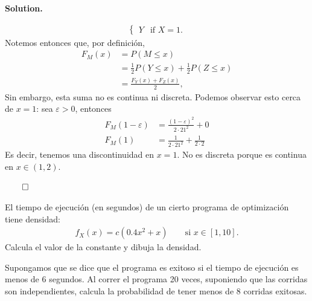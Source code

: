 \documentclass{article}
\theoremstyle{problemstyle}
\newenvironment{solution}{%
  \begin{mdframed}[linewidth=0.8pt,linecolor=Gray,backgroundcolor=Gray!5,roundcorner=5pt]%
  \noindent\textbf{Solution.}%
}{%
\hfill $ \qed $ 
  \end{mdframed}%
}
\begin{document}
\begin{solution}
\begin{align*}
\begin{cases}
			    Y & \text{if } X = 1.
		    \end{cases}
	\end{align*}
	Notemos entonces que, por definici\'on,
	\begin{align*}
		F_M(x) & = P(M\leq x)                                     \\
		       & = \frac{1}{2}P(Y\leq x) + \frac{1}{2} P(Z\leq x) \\
		       & = \displaystyle\frac{F_Y(x) + F_Z(x)}{2},
	\end{align*}
	Sin embargo, esta suma no es continua ni discreta. Podemos observar esto cerca de $ x = 1 $: sea $ \varepsilon > 0 $, entonces
	\begin{align*}
		F_M(1-\varepsilon) & = \frac{(1-\varepsilon)^2}{2\cdot 21^2} + 0  \\
		F_M(1)             & = \frac{1}{2\cdot 21^2} + \frac{1}{2\cdot 2}
	\end{align*}
	Es decir, tenemos una discontinuidad en $ x=1 $. No es discreta porque es continua en $ x\in (1,2) $.

\end{solution}

\pagebreak
\begin{problem}
El tiempo de ejecuci\'on (en segundos) de un cierto programa de optimizaci\'on tiene densidad:
\begin{align*}
	f_{X}(x) = c(0.4x^2 + x) \qquad \text{si } x\in [1,10].
\end{align*}
Calcula el valor de la constante y dibuja la densidad.

Supongamos que se dice que el programa es exitoso si el tiempo de ejecuci\'on es menos de 6 segundos. Al correr el programa 20 veces, suponiendo que las corridas son independientes, calcula la probabilidad de tener menos de 8 corridas exitosas.
\end{problem}
\end{document}
